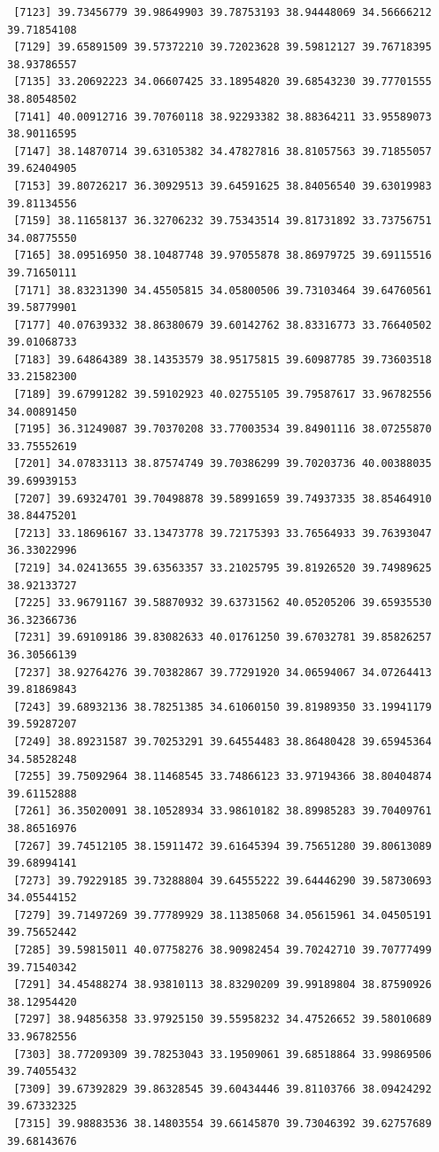 \documentclass[
  letterpaper,
  DIV=11,
  numbers=noendperiod]{scrartcl}
\begin{document}
\begin{verbatim}
 [7123] 39.73456779 39.98649903 39.78753193 38.94448069 34.56666212 39.71854108
 [7129] 39.65891509 39.57372210 39.72023628 39.59812127 39.76718395 38.93786557
 [7135] 33.20692223 34.06607425 33.18954820 39.68543230 39.77701555 38.80548502
 [7141] 40.00912716 39.70760118 38.92293382 38.88364211 33.95589073 38.90116595
 [7147] 38.14870714 39.63105382 34.47827816 38.81057563 39.71855057 39.62404905
 [7153] 39.80726217 36.30929513 39.64591625 38.84056540 39.63019983 39.81134556
 [7159] 38.11658137 36.32706232 39.75343514 39.81731892 33.73756751 34.08775550
 [7165] 38.09516950 38.10487748 39.97055878 38.86979725 39.69115516 39.71650111
 [7171] 38.83231390 34.45505815 34.05800506 39.73103464 39.64760561 39.58779901
 [7177] 40.07639332 38.86380679 39.60142762 38.83316773 33.76640502 39.01068733
 [7183] 39.64864389 38.14353579 38.95175815 39.60987785 39.73603518 33.21582300
 [7189] 39.67991282 39.59102923 40.02755105 39.79587617 33.96782556 34.00891450
 [7195] 36.31249087 39.70370208 33.77003534 39.84901116 38.07255870 33.75552619
 [7201] 34.07833113 38.87574749 39.70386299 39.70203736 40.00388035 39.69939153
 [7207] 39.69324701 39.70498878 39.58991659 39.74937335 38.85464910 38.84475201
 [7213] 33.18696167 33.13473778 39.72175393 33.76564933 39.76393047 36.33022996
 [7219] 34.02413655 39.63563357 33.21025795 39.81926520 39.74989625 38.92133727
 [7225] 33.96791167 39.58870932 39.63731562 40.05205206 39.65935530 36.32366736
 [7231] 39.69109186 39.83082633 40.01761250 39.67032781 39.85826257 36.30566139
 [7237] 38.92764276 39.70382867 39.77291920 34.06594067 34.07264413 39.81869843
 [7243] 39.68932136 38.78251385 34.61060150 39.81989350 33.19941179 39.59287207
 [7249] 38.89231587 39.70253291 39.64554483 38.86480428 39.65945364 34.58528248
 [7255] 39.75092964 38.11468545 33.74866123 33.97194366 38.80404874 39.61152888
 [7261] 36.35020091 38.10528934 33.98610182 38.89985283 39.70409761 38.86516976
 [7267] 39.74512105 38.15911472 39.61645394 39.75651280 39.80613089 39.68994141
 [7273] 39.79229185 39.73288804 39.64555222 39.64446290 39.58730693 34.05544152
 [7279] 39.71497269 39.77789929 38.11385068 34.05615961 34.04505191 39.75652442
 [7285] 39.59815011 40.07758276 38.90982454 39.70242710 39.70777499 39.71540342
 [7291] 34.45488274 38.93810113 38.83290209 39.99189804 38.87590926 38.12954420
 [7297] 38.94856358 33.97925150 39.55958232 34.47526652 39.58010689 33.96782556
 [7303] 38.77209309 39.78253043 33.19509061 39.68518864 33.99869506 39.74055432
 [7309] 39.67392829 39.86328545 39.60434446 39.81103766 38.09424292 39.67332325
 [7315] 39.98883536 38.14803554 39.66145870 39.73046392 39.62757689 39.68143676

\end{verbatim}
\end{document}

